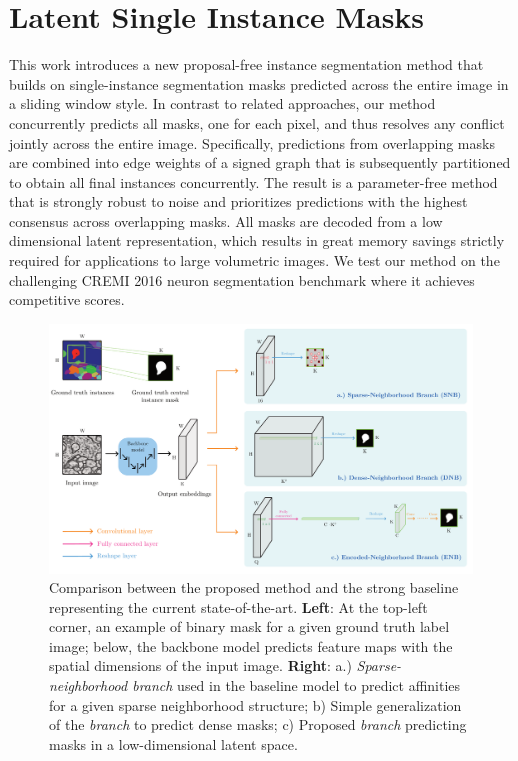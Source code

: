 \chapter{Latent Single Instance Masks}

This work introduces a new proposal-free instance segmentation method that builds on single-instance segmentation masks predicted across the entire image in a sliding window style.
In contrast to related approaches, our method concurrently predicts all masks, one for each pixel, and thus resolves any conflict jointly across the entire image.
Specifically, predictions from overlapping masks are combined into edge weights of a signed graph that is subsequently partitioned to obtain all final instances concurrently.
The result is a parameter-free method that is strongly robust to noise and prioritizes predictions with the highest consensus across overlapping masks. 
All masks are decoded from a low dimensional latent representation, which results in great memory savings strictly required for applications to large volumetric images. 
We test our method on the challenging CREMI 2016 neuron segmentation benchmark where it achieves competitive scores. 

\begin{figure}[t]
\centering
        \includegraphics[width=\textwidth]{./figures/LSIMasks/main_fig.pdf} %
        \caption{Comparison between the proposed method and the strong baseline representing the current state-of-the-art. \textbf{Left}: At the top-left corner, an example of binary \maskname mask for a given ground truth label image; below, the backbone model predicts feature maps with the spatial dimensions of the input image. \textbf{Right}: a.) \emph{Sparse-neighborhood branch} used in the baseline model to predict affinities for a given sparse neighborhood structure; b) Simple generalization of the \emph{\sparseBr branch} to predict dense \maskname masks; c) Proposed \emph{\encBr branch} predicting \maskname masks in a low-dimensional latent space.}
    \label{fig:main_figure}
\end{figure}




